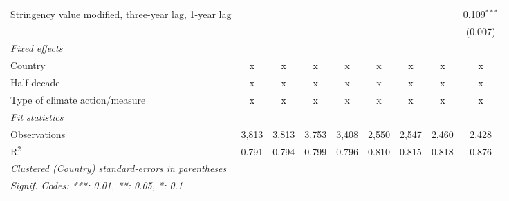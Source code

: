 \begin{table}[htbp]
\begin{tabular}{lcccccccc}
      Stringency value modified, three-year lag, 1-year lag                     &               &               &               &               &               &               &               & 0.109$^{***}$\\   
                                                                                &               &               &               &               &               &               &               & (0.007)\\   
      \emph{Fixed effects}\\
      Country                                                                   & x             & x             & x             & x             & x             & x             & x             & x\\  
      Half decade                                                               & x             & x             & x             & x             & x             & x             & x             & x\\  
      Type of climate action/measure                                            & x             & x             & x             & x             & x             & x             & x             & x\\  
      \midrule \emph{Fit statistics}\\
      Observations                                                              & 3,813         & 3,813         & 3,753         & 3,408         & 2,550         & 2,547         & 2,460         & 2,428\\  
      R$^2$                                                                     & 0.791         & 0.794         & 0.799         & 0.796         & 0.810         & 0.815         & 0.818         & 0.876\\  
      \midrule
      \multicolumn{9}{l}{\emph{Clustered (Country) standard-errors in parentheses}}\\
      \multicolumn{9}{l}{\emph{Signif. Codes: ***: 0.01, **: 0.05, *: 0.1}}\\
   \end{tabular}
\end{table}


